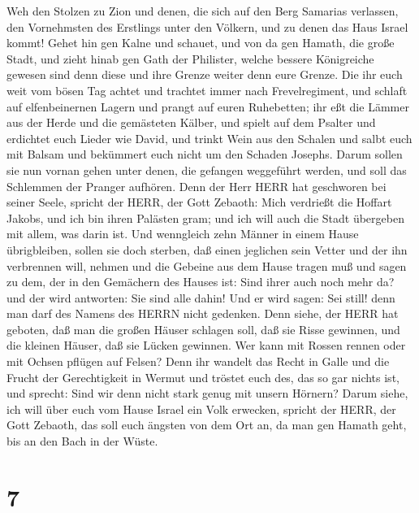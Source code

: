  Weh den Stolzen zu Zion und denen, die sich auf den Berg
Samarias verlassen, den Vornehmsten des Erstlings unter den Völkern, und
zu denen das Haus Israel kommt!  Gehet hin gen Kalne und
schauet, und von da gen Hamath, die große Stadt, und zieht hinab gen
Gath der Philister, welche bessere Königreiche gewesen sind denn diese
und ihre Grenze weiter denn eure Grenze.  Die ihr euch weit
vom bösen Tag achtet und trachtet immer nach Frevelregiment,
 und schlaft auf elfenbeinernen Lagern und prangt auf euren
Ruhebetten; ihr eßt die Lämmer aus der Herde und die gemästeten Kälber,
 und spielt auf dem Psalter und erdichtet euch Lieder wie
David,  und trinkt Wein aus den Schalen und salbt euch mit
Balsam und bekümmert euch nicht um den Schaden Josephs. 
Darum sollen sie nun vornan gehen unter denen, die gefangen weggeführt
werden, und soll das Schlemmen der Pranger aufhören.  Denn
der Herr HERR hat geschworen bei seiner Seele, spricht der HERR, der
Gott Zebaoth: Mich verdrießt die Hoffart Jakobs, und ich bin ihren
Palästen gram; und ich will auch die Stadt übergeben mit allem, was
darin ist.  Und wenngleich zehn Männer in einem Hause
übrigbleiben, sollen sie doch sterben,  daß einen jeglichen
sein Vetter und der ihn verbrennen will, nehmen und die Gebeine aus dem
Hause tragen muß und sagen zu dem, der in den Gemächern des Hauses ist:
Sind ihrer auch noch mehr da? und der wird antworten: Sie sind alle
dahin! Und er wird sagen: Sei still! denn man darf des Namens des HERRN
nicht gedenken.  Denn siehe, der HERR hat geboten, daß man
die großen Häuser schlagen soll, daß sie Risse gewinnen, und die kleinen
Häuser, daß sie Lücken gewinnen.  Wer kann mit Rossen
rennen oder mit Ochsen pflügen auf Felsen? Denn ihr wandelt das Recht in
Galle und die Frucht der Gerechtigkeit in Wermut  und
tröstet euch des, das so gar nichts ist, und sprecht: Sind wir denn
nicht stark genug mit unsern Hörnern?  Darum siehe, ich
will über euch vom Hause Israel ein Volk erwecken, spricht der HERR, der
Gott Zebaoth, das soll euch ängsten von dem Ort an, da man gen Hamath
geht, bis an den Bach in der Wüste.

\hypertarget{section-6}{%
\section{7}\label{section-6}}

